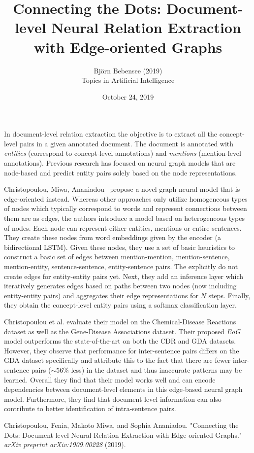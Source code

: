 \documentclass[12pt]{article}
\begin{document}
 
 
\title{Connecting the Dots: Document-level Neural Relation Extraction
with Edge-oriented Graphs}
\author{Bj\"orn Bebensee (2019)\\ %
Topics in Artificial Intelligence}
\date{October 24, 2019}
\maketitle

\noindent
In document-level relation extraction the objective is to extract all the concept-level pairs in a given annotated document. The document is annotated with \emph{entities} (correspond to concept-level annotations) and \emph{mentions} (mention-level annotations). Previous research has focused on neural graph models that are node-based and predict entity pairs solely based on the node representations.

Christopoulou, Miwa, Ananiadou~\cite{dots} propose a novel graph neural model that is edge-oriented instead. Whereas other approaches only utilize homogeneous types of nodes which typically correspond to words and represent connections between them are as edges, the authors introduce a model based on heterogeneous types of nodes. Each node can represent either entities, mentions or entire sentences. They create these nodes from word embeddings given by the encoder (a bidirectional LSTM). Given these nodes, they use a set of basic heuristics to construct a basic set of edges between mention-mention, mention-sentence, mention-entity, sentence-sentence, entity-sentence pairs. The explicitly do not create edges for entity-entity pairs yet. Next, they add an inference layer which iteratively generates edges based on paths between two nodes (now including entity-entity pairs) and aggregates their edge representations for $N$ steps. Finally, they obtain the concept-level entity pairs using a softmax classification layer.

Christopoulou et al. evaluate their model on the Chemical-Disease Reactions dataset as well as the Gene-Disease Associations dataset. Their proposed \emph{EoG} model outperforms the state-of-the-art on both the CDR and GDA datasets. However, they observe that performance for inter-sentence pairs differs on the GDA dataset specifically and attribute this to the fact that there are fewer inter-sentence pairs ($\sim$56\% less) in the dataset and thus inaccurate patterns may be learned. Overall they find that their model works well and can encode dependencies between document-level elements in this edge-based neural graph model. Furthermore, they find that document-level information can also contribute to better identification of intra-sentence pairs.


\begin{thebibliography}{9}
Christopoulou, Fenia, Makoto Miwa, and Sophia Ananiadou. "Connecting the Dots: Document-level Neural Relation Extraction with Edge-oriented Graphs." \emph{arXiv preprint arXiv:1909.00228} (2019).

\end{thebibliography}
 
\end{document}
